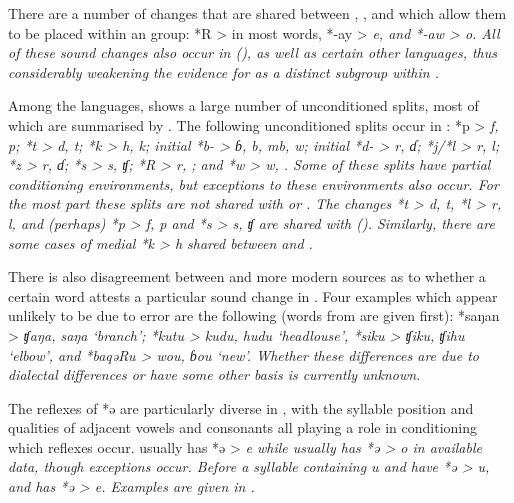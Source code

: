 There are a number of changes that are shared between ,
, and  which allow them to be placed within an  group: *R > {\0} in most words, *-ay > \it{e,}
and *-aw > \it{o}.
All of these sound changes also occur in  (),
as well as certain other  languages,
thus considerably weakening the evidence for 
as a distinct subgroup within .

Among the  languages,
 shows a large number of unconditioned splits,
most of which are summarised by \citet[75--83]{Blust2008}.
The following unconditioned splits occur in : *p > \it{f,
p}; *t > \it{d,
t}; *k > \it{h,
k}; initial *b- > \it{ɓ,
b, mb, w}; initial *d- > \it{r,
ɗ}; *j/*l > \it{r,
l}; *z > \it{r,
ɗ}; *s > \it{s,
ʧ}; *R > \it{r,} {\0};
and *w > \it{w,} {\0}.
Some of these splits have partial conditioning environments,
but exceptions to these environments also occur.
For the most part these splits are not shared with  or .
The changes *t > \it{d,
t}, *l > \it{r, l},
and (perhaps) *p > \it{f,
p} and *s > \it{s,
ʧ} are shared with  ().
Similarly, there are some cases of medial *k > \it{h} shared
between  and .

There is also disagreement between \citet{Zollinger1850}
and more modern sources as to whether a certain word attests
a particular sound change in .
Four examples which appear unlikely to be due to error are the
following (words from \citet{Zollinger1850} are given first): *saŋan
> \it{ʧaŋa}, \it{saŋa} ‘branch’; *kutu > \it{kudu},
\it{hudu} ‘headlouse’, *siku > \it{ʧiku}, \it{ʧihu} ‘elbow’,
and *baqəRu > \it{wou}, \it{ɓou} ‘new’.
Whether these differences are due to dialectal differences or
have some other basis is currently unknown.

The reflexes of *ə are particularly diverse in ,
with the syllable position
and qualities of adjacent vowels
and consonants all playing a role in conditioning which reflexes occur.
 usually has *ə > \it{e} while  usually has *ə > \it{o}
in available data, though exceptions occur.
Before a syllable containing \it{u} 
and  have *ə > \it{u},
and  has *ə > \it{e}.
Examples are given in .

